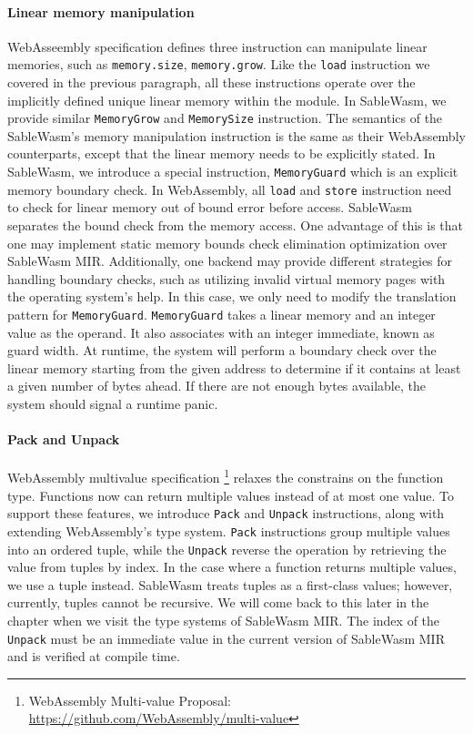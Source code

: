 \paragraph{Linear memory manipulation} WebAsseembly specification defines three instruction can manipulate linear memories, such as \texttt{memory.size}, \texttt{memory.grow}. Like the \texttt{load} instruction we covered in the previous paragraph, all these instructions operate over the implicitly defined unique linear memory within the module. In SableWasm, we provide similar \texttt{MemoryGrow} and \texttt{MemorySize} instruction. The semantics of the SableWasm's memory manipulation instruction is the same as their WebAssembly counterparts, except that the linear memory needs to be explicitly stated. In SableWasm, we introduce a special instruction, \texttt{MemoryGuard} which is an explicit memory boundary check. In WebAssembly, all \texttt{load} and \texttt{store} instruction need to check for linear memory out of bound error before access. SableWasm separates the bound check from the memory access. One advantage of this is that one may implement static memory bounds check elimination optimization over SableWasm MIR. Additionally, one backend may provide different strategies for handling boundary checks, such as utilizing invalid virtual memory pages with the operating system's help. In this case, we only need to modify the translation pattern for \texttt{MemoryGuard}. \texttt{MemoryGuard} takes a linear memory and an integer value as the operand. It also associates with an integer immediate, known as guard width. At runtime, the system will perform a boundary check over the linear memory starting from the given address to determine if it contains at least a given number of bytes ahead. If there are not enough bytes available, the system should signal a runtime panic.

\paragraph{Pack and Unpack} WebAssembly multivalue specification \footnote{WebAssembly Multi-value Proposal: \url{https://github.com/WebAssembly/multi-value}} relaxes the constrains on the function type. Functions now can return multiple values instead of at most one value. To support these features, we introduce \texttt{Pack} and \texttt{Unpack} instructions, along with extending WebAssembly's type system. \texttt{Pack} instructions group multiple values into an ordered tuple, while the \texttt{Unpack} reverse the operation by retrieving the value from tuples by index. In the case where a function returns multiple values, we use a tuple instead. SableWasm treats tuples as a first-class values; however, currently, tuples cannot be recursive. We will come back to this later in the chapter when we visit the type systems of SableWasm MIR. The index of the \texttt{Unpack} must be an immediate value in the current version of SableWasm MIR and is verified at compile time.


